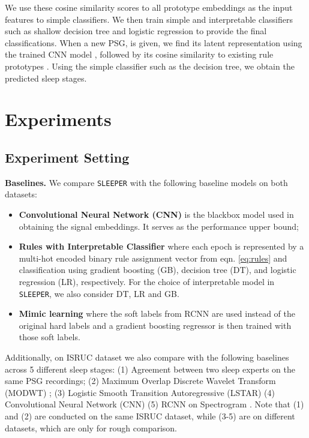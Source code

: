 \documentclass[pmlr]{jmlr}
\newcommand{\mname}
{\texttt{SLEEPER}\xspace}
\begin{document}
 We use these cosine similarity scores  to all prototype embeddings as the input features to simple classifiers. We then train simple and interpretable classifiers such as shallow decision tree and logistic regression to provide the final classifications. When a new PSG,  is given, we find its latent representation using the trained CNN model , followed by its cosine similarity to existing rule prototypes . Using the simple classifier such as the decision tree, we obtain the predicted sleep stages.\section{Experiments} 
\subsection{Experiment Setting} 

\noindent\textbf{Baselines.} 
We compare \mname with the following baseline models on both datasets: 
\begin{itemize}
    \item \textbf{Convolutional Neural Network (CNN)}  is the blackbox model used in obtaining the signal embeddings. It serves as the performance upper bound;
    \item \textbf{Rules with Interpretable Classifier} where each epoch is represented by a multi-hot encoded binary rule assignment vector  from eqn. \ref{eq:rules} and classification using gradient boosting (GB), decision tree (DT), and logistic regression (LR), respectively.  For the choice of interpretable model in  \mname, we also consider DT, LR and GB.
    \item \textbf{Mimic learning} \citep{mimic} where the soft labels from RCNN are used instead of the original hard labels and a gradient boosting regressor is then trained with those soft labels. 
\end{itemize}


Additionally, on ISRUC dataset we also compare with the following baselines across 5 different sleep stages: (1) Agreement between two sleep experts on the same PSG recordings; (2) Maximum Overlap Discrete Wavelet Transform (MODWT) \citep{isruc, khalighi}; (3) Logistic Smooth Transition Autoregressive (LSTAR) \citep{lstar} (4) Convolutional Neural Network (CNN) \citep{chambon2018deep} (5) RCNN on Spectrogram \citep{10.1093/jamia/ocy131}. Note that (1) and (2) are conducted on the same ISRUC dataset, while (3-5) are on different datasets, which are only for rough comparison.\\
 
\end{document}
